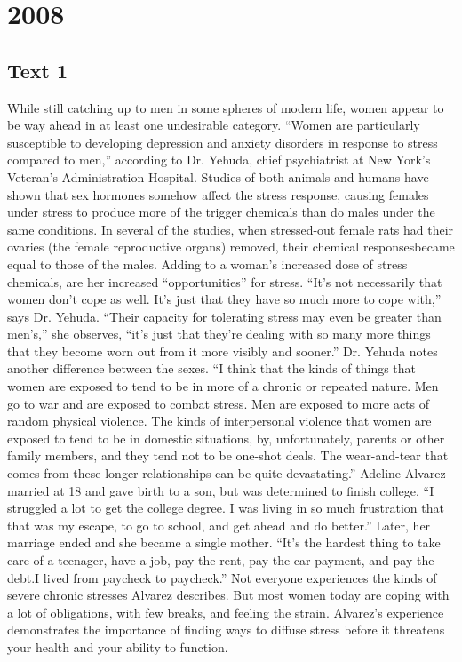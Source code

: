 
\section{2008}
\subsection{Text 1}
While still catching up to men in some spheres of modern life, women appear to be way ahead in at least one undesirable category. “Women are particularly susceptible to developing depression and anxiety disorders in response to stress compared to men,” according to Dr. Yehuda, chief psychiatrist at New York’s Veteran’s Administration Hospital.
Studies of both animals and humans have shown that sex hormones somehow affect the stress response, causing females under stress to produce more of the trigger chemicals than do males under the same conditions. In several of the studies, when stressed-out female rats had their ovaries (the female reproductive organs) removed, their chemical responsesbecame equal to those of the males.
Adding to a woman’s increased dose of stress chemicals, are her increased “opportunities” for stress. “It’s not necessarily that women don’t cope as well. It’s just that they have so much more to cope with,” says Dr. Yehuda. “Their capacity for tolerating stress may even be greater than men’s,” she observes, “it’s just that they’re dealing with so many more things that they become worn out from it more visibly and sooner.”
Dr. Yehuda notes another difference between the sexes. “I think that the kinds of things that women are exposed to tend to be in more of a chronic or repeated nature. Men go to war and are exposed to combat stress. Men are exposed to more acts of random physical violence. The kinds of interpersonal violence that women are exposed to tend to be in domestic situations, by, unfortunately, parents or other family members, and they tend not to be one-shot deals. The wear-and-tear that comes from these longer relationships can be quite devastating.”
Adeline Alvarez married at 18 and gave birth to a son, but was determined to finish college. “I struggled a lot to get the college degree. I was living in so much frustration that that was my escape, to go to school, and get ahead and do better.” Later, her marriage ended and she became a single mother. “It’s the hardest thing to take care of a teenager, have a job, pay the rent, pay the car payment, and pay the debt.I lived from paycheck to paycheck.”
Not everyone experiences the kinds of severe chronic stresses Alvarez describes. But most women today are coping with a lot of obligations, with few breaks, and feeling the strain. Alvarez’s experience demonstrates the importance of finding ways to diffuse stress before it threatens your health and your ability to function.
